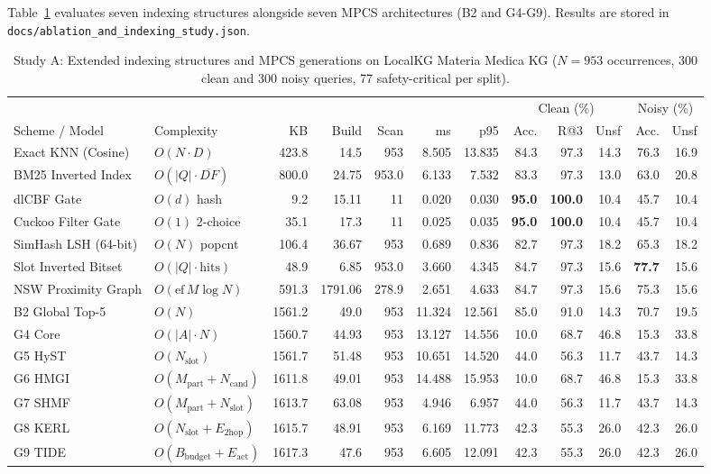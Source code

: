 \documentclass[12pt,a4paper,oneside]{report}
\newcommand{\code}[1]{\texttt{\small #1}}
\begin{document}
Table~\ref{tab:mmkg_study_a} evaluates seven indexing structures alongside seven MPCS architectures (B2 and G4-G9). Results are stored in \code{docs/ablation\_and\_indexing\_study.json}.

\begin{table}[H]
\centering
\caption{Study A: Extended indexing structures and MPCS generations on LocalKG Materia Medica KG ($N=953$ occurrences, 300 clean and 300 noisy queries, 77 safety-critical per split).}
\label{tab:mmkg_study_a}
\footnotesize
\setlength{\tabcolsep}{1.8pt}
\begin{tabular}{@{}llrrrrr rrr rr@{}}
\toprule
& & & & & & & \multicolumn{3}{c}{Clean (\%)} & \multicolumn{2}{c}{Noisy (\%)}\\
\cmidrule(lr){8-10}\cmidrule(l){11-12}
Scheme / Model & Complexity & KB & Build & Scan & ms & p95 & Acc. & R@3 & Unsf & Acc. & Unsf\\
\midrule
Exact KNN (Cosine) & $O(N\cdot D)$ & 423.8 & 14.5 & 953 & 8.505 & 13.835 & 84.3 & 97.3 & 14.3 & 76.3 & 16.9\\
BM25 Inverted Index & $O(|Q|\cdot\overline{DF})$ & 800.0 & 24.75 & 953.0 & 6.133 & 7.532 & 83.3 & 97.3 & 13.0 & 63.0 & 20.8\\
dlCBF Gate & $O(d)$ hash & 9.2 & 15.11 & 11 & 0.020 & 0.030 & \textbf{95.0} & \textbf{100.0} & 10.4 & 45.7 & 10.4\\
Cuckoo Filter Gate & $O(1)$ 2-choice & 35.1 & 17.3 & 11 & 0.025 & 0.035 & \textbf{95.0} & \textbf{100.0} & 10.4 & 45.7 & 10.4\\
SimHash LSH (64-bit) & $O(N)$ popcnt & 106.4 & 36.67 & 953 & 0.689 & 0.836 & 82.7 & 97.3 & 18.2 & 65.3 & 18.2\\
Slot Inverted Bitset & $O(|Q|\cdot\text{hits})$ & 48.9 & 6.85 & 953.0 & 3.660 & 4.345 & 84.7 & 97.3 & 15.6 & \textbf{77.7} & 15.6\\
NSW Proximity Graph & $O(\text{ef}\,M\log N)$ & 591.3 & 1791.06 & 278.9 & 2.651 & 4.633 & 84.7 & 97.3 & 15.6 & 75.3 & 15.6\\
\midrule
B2 Global Top-5 & $O(N)$ & 1561.2 & 49.0 & 953 & 11.324 & 12.561 & 85.0 & 91.0 & 14.3 & 70.7 & 19.5\\
G4 Core & $O(|A|\cdot N)$ & 1560.7 & 44.93 & 953 & 13.127 & 14.556 & 10.0 & 68.7 & 46.8 & 15.3 & 33.8\\
G5 HyST & $O(N_{\text{slot}})$ & 1561.7 & 51.48 & 953 & 10.651 & 14.520 & 44.0 & 56.3 & 11.7 & 43.7 & 14.3\\
G6 HMGI & $O(M_{\text{part}}+N_{\text{cand}})$ & 1611.8 & 49.01 & 953 & 14.488 & 15.953 & 10.0 & 68.7 & 46.8 & 15.3 & 33.8\\
G7 SHMF & $O(M_{\text{part}}+N_{\text{slot}})$ & 1613.7 & 63.08 & 953 & 4.946 & 6.957 & 44.0 & 56.3 & 11.7 & 43.7 & 14.3\\
G8 KERL & $O(N_{\text{slot}}+E_{\text{2hop}})$ & 1615.7 & 48.91 & 953 & 6.169 & 11.773 & 42.3 & 55.3 & 26.0 & 42.3 & 26.0\\
G9 TIDE & $O(B_{\text{budget}}+E_{\text{act}})$ & 1617.3 & 47.6 & 953 & 6.605 & 12.091 & 42.3 & 55.3 & 26.0 & 42.3 & 26.0\\
\bottomrule
\end{tabular}
\end{table}
\end{document}
